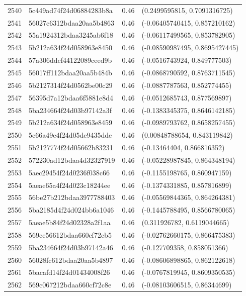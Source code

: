 \begin{table}[ht]
\begin{tabular}{rlrl}
  2540 & 5c449ad74f24d06884283b8a & 0.46 & (0.2499595815, 0.7091316725) \\ 
  2541 & 56027c6312bdaa20aa5b4863 & 0.46 & (-0.06405740415, 0.857210162) \\ 
  2542 & 55a1924312bdaa3245ab6f18 & 0.46 & (-0.06117499565, 0.853782905) \\ 
  2543 & 5b212a634f24d058963e8450 & 0.46 & (-0.08590987495, 0.8695427445) \\ 
  2544 & 57a306ddcf44122089ceed9b & 0.46 & (-0.0516743924, 0.849777503) \\ 
  2545 & 56017ff112bdaa20aa5b484b & 0.46 & (-0.0868790592, 0.8763711545) \\ 
  2546 & 5b2127314f24d0562be00c29 & 0.46 & (-0.0887787563, 0.852774455) \\ 
  2547 & 56395d7a12bdaa6f5881e8d4 & 0.46 & (-0.0512685743, 0.877569897) \\ 
  2548 & 5ba234664f24d03b97142a3f & 0.46 & (-0.1383345375, 0.8646142185) \\ 
  2549 & 5b212a634f24d058963e8459 & 0.46 & (-0.0989793762, 0.8658257455) \\ 
  2550 & 5c66a49e4f24d05de9435dde & 0.46 & (0.00848788654, 0.843119842) \\ 
  2551 & 5b2127774f24d05662b83231 & 0.46 & (-0.13464404, 0.866816352) \\ 
  2552 & 572230ad12bdaa4d32327919 & 0.46 & (-0.05228987845, 0.864348194) \\ 
  2553 & 5aec29454f24d0236f038c66 & 0.46 & (-0.1155198765, 0.860947159) \\ 
  2554 & 5aeae65a4f24d023c18244ee & 0.46 & (-0.1374331885, 0.857816899) \\ 
  2555 & 56be27b212bdaa3977788403 & 0.46 & (-0.05569844365, 0.864264381) \\ 
  2556 & 5ba2185d4f24d024bb6a1046 & 0.46 & (-0.1445788495, 0.8566780065) \\ 
  2557 & 5aeae5b84f24d02328a2f1aa & 0.46 & (0.311926782, 0.6119044665) \\ 
  2558 & 569ce56612bdaa660cf72cb5 & 0.46 & (-0.02762660175, 0.866475383) \\ 
  2559 & 5ba234664f24d03b97142a46 & 0.46 & (-0.127709358, 0.858051366) \\ 
  2560 & 56028fc612bdaa20aa5b4897 & 0.46 & (-0.08606898865, 0.862122618) \\ 
  2561 & 5bacafd14f24d01434008f26 & 0.46 & (-0.0767819945, 0.8609350535) \\ 
  2562 & 569c067212bdaa660cf72c8e & 0.46 & (-0.08103606515, 0.86344699) \\ 

\end{tabular}
\end{table}
